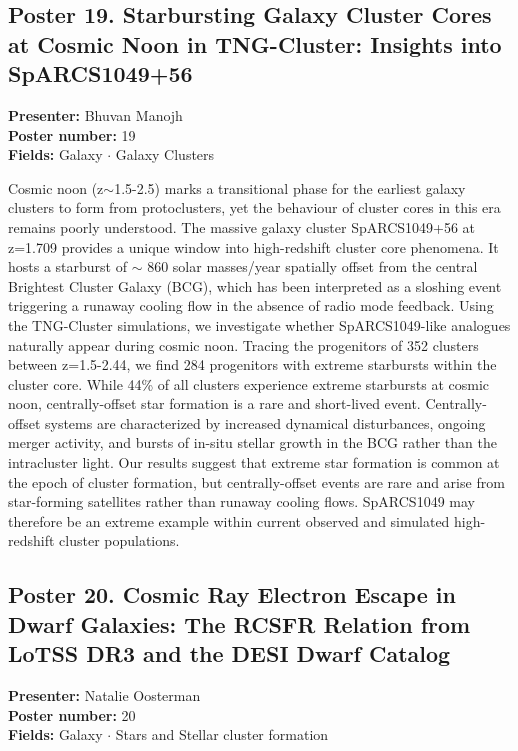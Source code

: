 \hypertarget{poster-abstract-talk-225}{}\label{poster-abstract-page-talk-225}
\subsection*{Poster 19. Starbursting Galaxy Cluster Cores at Cosmic Noon in TNG-Cluster: Insights into SpARCS1049+56}
\textbf{Presenter:} Bhuvan Manojh\\
\textbf{Poster number:} 19\\
\textbf{Fields:} Galaxy $\cdot$ Galaxy Clusters

Cosmic noon (z$\sim$1.5-2.5) marks a transitional phase for the earliest galaxy clusters to form from protoclusters, yet the behaviour of cluster cores in this era remains poorly understood. The massive galaxy cluster SpARCS1049+56 at z=1.709 provides a unique window into high-redshift cluster core phenomena. It hosts a starburst of $\sim$ 860 solar masses/year spatially offset from the central Brightest Cluster Galaxy (BCG), which has been interpreted as a sloshing event triggering a runaway cooling flow in the absence of radio mode feedback. Using the TNG-Cluster simulations, we investigate whether SpARCS1049-like analogues naturally appear during cosmic noon. Tracing the progenitors of 352 clusters between z=1.5-2.44, we find 284 progenitors with extreme starbursts within the cluster core. While 44\% of all clusters experience extreme starbursts at cosmic noon, centrally-offset star formation is a rare and short-lived event. Centrally-offset systems are characterized by increased dynamical disturbances, ongoing merger activity, and bursts of in-situ stellar growth in the BCG rather than the intracluster light. Our results suggest that extreme star formation is common at the epoch of cluster formation, but centrally-offset events are rare and arise from star-forming satellites rather than runaway cooling flows. SpARCS1049 may therefore be an extreme example within current observed and simulated high-redshift cluster populations.

\hypertarget{poster-abstract-talk-272}{}\label{poster-abstract-page-talk-272}
\subsection*{Poster 20. Cosmic Ray Electron Escape in Dwarf Galaxies: The RCSFR Relation from LoTSS DR3 and the DESI Dwarf Catalog}
\textbf{Presenter:} Natalie Oosterman\\
\textbf{Poster number:} 20\\
\textbf{Fields:} Galaxy $\cdot$ Stars and Stellar cluster formation

